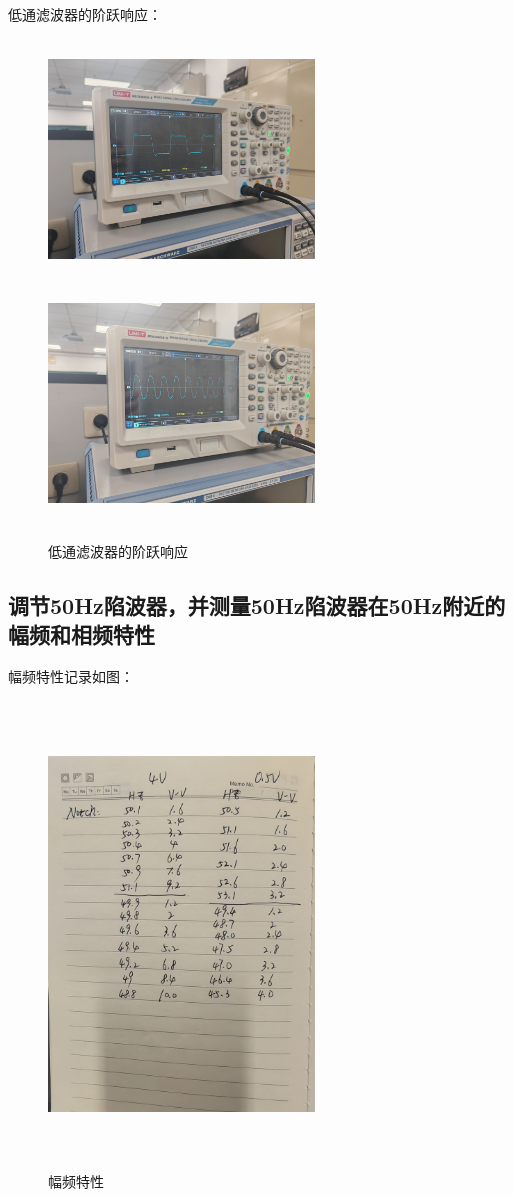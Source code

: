 \documentclass{article}
\begin{document}
        低通滤波器的阶跃响应：
        \begin{figure}[htbp]
            \centering
            \includegraphics[width=200pt,height=180pt]{1.jpg}
            \includegraphics[width=200pt,height=180pt]{2.jpg}
            \caption{低通滤波器的阶跃响应}
        \end{figure}

\subsection{调节50Hz陷波器，并测量50Hz陷波器在50Hz附近的幅频和相频特性}

幅频特性记录如图：
\begin{figure}[htbp]
    \centering
    \includegraphics[width=200pt,height=350pt]{4&0.5.jpg}
    \caption{幅频特性}
\end{figure}
\end{document}

